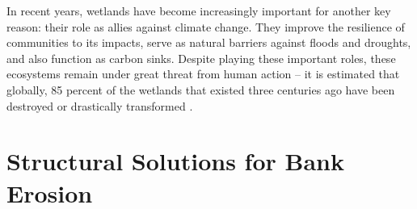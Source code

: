 In recent years, wetlands have become increasingly important for another key reason: their role as allies against climate change. They improve the resilience of communities to its impacts, serve as natural barriers against floods and droughts, and also function as carbon sinks. Despite playing these important roles, these ecosystems remain under great threat from human action – it is estimated that globally, 85 percent of the wetlands that existed three centuries ago have been destroyed or drastically transformed \autocite{hibaParanaRiverEcological2024}. 


\newpage

\section{Structural Solutions for Bank Erosion}
\label{section_8.2}

